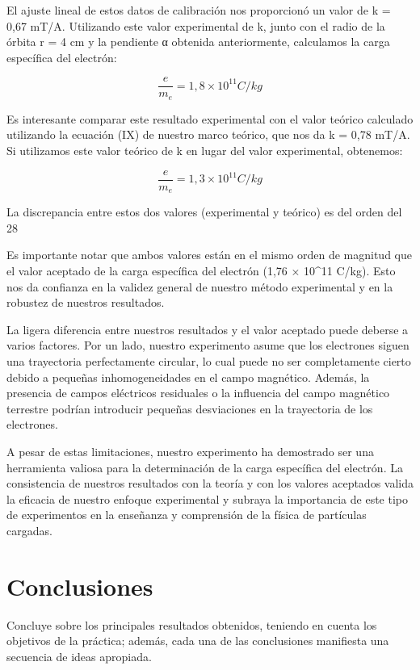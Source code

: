 \documentclass[twocolumn,a4paper,11pt]{scrartcl}
\begin{document}
El ajuste lineal de estos datos de calibración nos proporcionó un valor de k = 0,67 mT/A. Utilizando este valor experimental de k, junto con el radio de la órbita r = 4 cm y la pendiente α obtenida anteriormente, calculamos la carga específica del electrón:

\begin{equation}
\frac{e}{m_e} = 1,8 \times 10^{11} C/kg
\end{equation}

Es interesante comparar este resultado experimental con el valor teórico calculado utilizando la ecuación (IX) de nuestro marco teórico, que nos da k = 0,78 mT/A. Si utilizamos este valor teórico de k en lugar del valor experimental, obtenemos:

\begin{equation}
\frac{e}{m_e} = 1,3 \times 10^{11} C/kg
\end{equation}

La discrepancia entre estos dos valores (experimental y teórico) es del orden del 28%

Es importante notar que ambos valores están en el mismo orden de magnitud que el valor aceptado de la carga específica del electrón (1,76 × 10^11 C/kg). Esto nos da confianza en la validez general de nuestro método experimental y en la robustez de nuestros resultados.

La ligera diferencia entre nuestros resultados y el valor aceptado puede deberse a varios factores. Por un lado, nuestro experimento asume que los electrones siguen una trayectoria perfectamente circular, lo cual puede no ser completamente cierto debido a pequeñas inhomogeneidades en el campo magnético. Además, la presencia de campos eléctricos residuales o la influencia del campo magnético terrestre podrían introducir pequeñas desviaciones en la trayectoria de los electrones.

A pesar de estas limitaciones, nuestro experimento ha demostrado ser una herramienta valiosa para la determinación de la carga específica del electrón. La consistencia de nuestros resultados con la teoría y con los valores aceptados valida la eficacia de nuestro enfoque experimental y subraya la importancia de este tipo de experimentos en la enseñanza y comprensión de la física de partículas cargadas.

\section{Conclusiones}
Concluye sobre los principales resultados obtenidos, teniendo en cuenta los objetivos de la práctica; además, cada una de las conclusiones manifiesta una secuencia de ideas apropiada.


  
\end{document}
